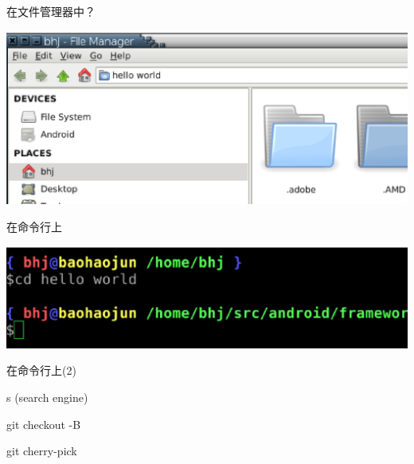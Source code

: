 \documentclass[presentation,dvipdfmx,CJKbookmarks]{beamer}
\begin{document}
\begin{CJK*}{UTF8}{simsun}
\begin{frame}[label={sec:org7f9bd72}]{在文件管理器中？}
\begin{center}
\includegraphics[width=.9\linewidth]{./images/file-manager.ps}
\end{center}
\end{frame}

\begin{frame}[label={sec:orgcac917b}]{在命令行上}
\begin{center}
\includegraphics[width=.9\linewidth]{./images/ui-cli.ps}
\end{center}
\end{frame}

\begin{frame}[label={sec:org0658029}]{在命令行上(2)}
\begin{block}{s (search engine)}
\end{block}
\begin{block}{git checkout -B}
\end{block}
\begin{block}{git cherry-pick}
\end{block}
\end{frame}



\end{CJK*}
\end{document}
